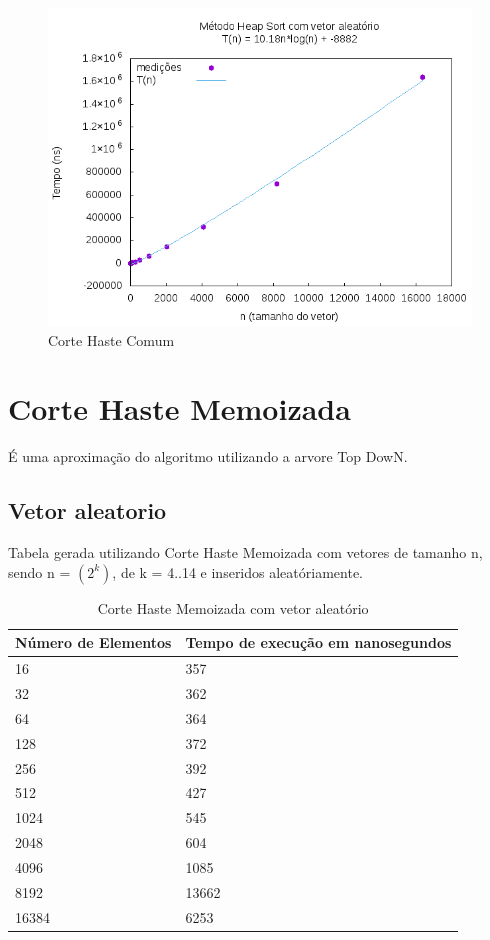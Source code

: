 \documentclass[12pt,a4paper,twoside]{report}
\begin{document}
\begin{figure}[H]
    \centering
    \includegraphics[width=0.7\linewidth]{graficos/HeapSort/vIntAleatorio/vIntAleatorio.png}
  \caption{Corte Haste Comum}
\end{figure}


\section{Corte Haste Memoizada}

É uma aproximação do algoritmo utilizando a arvore Top DowN.

\subsection{Vetor aleatorio}
Tabela gerada utilizando Corte Haste Memoizada com vetores de tamanho n, sendo n = $(2^k)$, de k = 4..14 e inseridos aleatóriamente.
\begin{table}[H]
\centering
\caption{Corte Haste Memoizada com vetor aleatório}
\label{my-label}
\begin{tabular}{|l|l|}
\hline
\multicolumn{1}{|c|}{\textbf{Número de Elementos}} & \multicolumn{1}{c|}{\textbf{Tempo de execução em nanosegundos}} \\ \hline
16 & 357 \\ \hline
32 & 362 \\ \hline
64 & 364 \\ \hline
128 & 372 \\ \hline
256 & 392 \\ \hline
512 & 427 \\ \hline
1024 & 545 \\ \hline
2048 & 604 \\ \hline
4096 & 1085 \\ \hline
8192 & 13662 \\ \hline
16384 & 6253 \\ \hline
\end{tabular}
\end{table}
\end{document}
